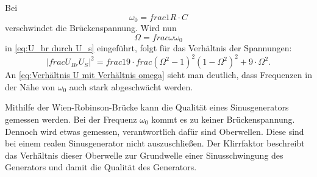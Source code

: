 Bei 
\begin{equation}
    \omega_0 = frac{1}{R \cdot C}
\end{equation}
verschwindet die Brückenspannung.
Wird nun
\begin{equation}
    \Omega = frac{\omega}{\omega_0}
\end{equation}
in \eqref{eq:U_br durch U_s} eingeführt, folgt für das Verhältnis der Spannungen:
\begin{equation}
    \label{eq:Verhältnis U mit Verhältnis omega}
    \lvert{frac{U_{Br}}{U_S}}\rvert^2 = frac{1}{9} \cdot frac{(\Omega^2 - 1)^2}{(1 - \Omega^2)^2 + 9 \cdot \Omega^2} .
\end{equation}
An \eqref{eq:Verhältnis U mit Verhältnis omega} sieht man deutlich, dass Frequenzen in der Nähe von $\omega_0$ auch stark abgeschwächt werden.

Mithilfe der Wien-Robinson-Brücke kann die Qualität eines Sinusgenerators gemessen werden.
Bei der Frequenz $\omega_0$ kommt es zu keiner Brückenspannung.
Dennoch wird etwas gemessen, verantwortlich dafür sind Oberwellen.
Diese sind bei einem realen Sinusgenerator nicht auszuschließen.
Der Klirrfaktor beschreibt das Verhältnis dieser Oberwelle zur Grundwelle einer Sinusschwingung des Generators
und damit die Qualität des Generators.